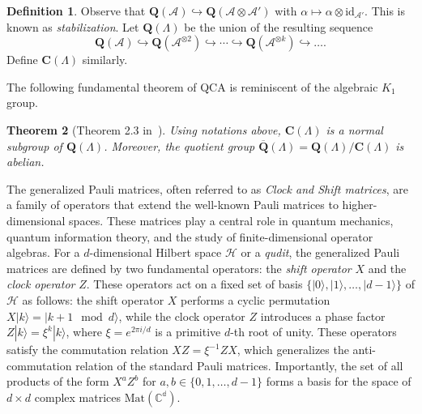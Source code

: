 \documentclass{article}
\newtheorem{theorem}{Theorem}
\theoremstyle{definition}
\newtheorem{defn}[theorem]{Definition}
\newcommand{\id}{\mathrm{id}}
\newcommand{\SA}{{\mathscr A}}
\begin{document}
\begin{defn}
    Observe that $\mathbf Q(\SA)\hookrightarrow \mathbf Q(\SA\otimes \SA')$ with $\alpha \mapsto \alpha \otimes \id_{\SA'}$. This is known as \textit{stabilization}. Let $\mathbf Q(\Lambda)$ be the union of the resulting sequence
    $$\mathbf Q(\SA)\hookrightarrow \mathbf Q(\SA^{\otimes 2})\hookrightarrow\cdots \hookrightarrow \mathbf Q(\SA^{\otimes k})\hookrightarrow\dots.$$ Define $\mathbf C(\Lambda)$ similarly.
\end{defn}
The following fundamental theorem of QCA is reminiscent of the algebraic $K_1$ group. 
\begin{theorem}[Theorem 2.3 in~\cite{freedman2020classification}]
     Using notations above, $\mathbf C(\Lambda)$ is a normal subgroup of $\mathbf Q(\Lambda)$. Moreover, the quotient group $\overline{\mathbf Q}(\Lambda)=\mathbf Q(\Lambda)/\mathbf C(\Lambda)$ is abelian. 
\end{theorem}


The generalized Pauli matrices, often referred to as \textit{Clock and Shift matrices}, are a family of operators that extend the well-known Pauli matrices to higher-dimensional spaces. These matrices play a central role in quantum mechanics, quantum information theory, and the study of finite-dimensional operator algebras. For a \(d\)-dimensional Hilbert space \(\mathcal{H}\) or a \emph{qudit}, the generalized Pauli matrices are defined by two fundamental operators: the \textit{shift operator} \(X\) and the \textit{clock operator} \(Z\). These operators act on a fixed set of basis \(\{|0\rangle, |1\rangle, \dots, |d-1\rangle\}\) of \(\mathcal{H}\) as follows: the shift operator \(X\) performs a cyclic permutation \(X|k\rangle = |k+1 \mod d\rangle\), while the clock operator \(Z\) introduces a phase factor \(Z|k\rangle = \xi^k |k\rangle\), where \(\xi = e^{2\pi i/d}\) is a primitive \(d\)-th root of unity. These operators satisfy the  commutation relation \(XZ = \xi^{-1} ZX\), which generalizes the anti-commutation relation of the standard Pauli matrices. Importantly, the set of all products of the form \(X^a Z^b\) for \(a, b \in \{0, 1, \dots, d-1\}\) forms a basis for the space of \(d \times d\) complex matrices \(\mathrm{Mat}(\mathbb{C^d})\).  
\end{document}
